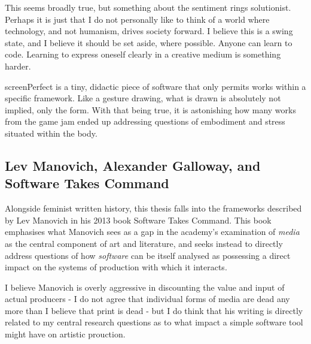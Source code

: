 This seems broadly true, but something about the sentiment rings solutionist. Perhaps it is just that I do not personally like to think of a world where technology, and not humanism, drives society forward. I believe this is a swing state, and I believe it should be set aside, where possible. Anyone can learn to code. Learning to express oneself clearly in a creative medium is something harder.

screenPerfect is a tiny, didactic piece of software that only permits works within a specific framework. Like a gesture drawing, what is drawn is absolutely not implied, only the form. With that being true, it is astonishing how many works from the game jam ended up addressing questions of embodiment and stress situated within the body.

\subsection{Lev Manovich, Alexander Galloway, and Software Takes Command}
Alongside feminist written history, this thesis falls into the frameworks described by Lev Manovich in his 2013 book Software Takes Command. This book emphasises what Manovich sees as a gap in the academy's examination of \textit{media} as the central component of art and literature, and seeks instead to directly address questions of how \textit{software} can be itself analysed as possessing a direct impact on the systems of production with which it interacts.

I believe Manovich is overly aggressive in discounting the value and input of actual producers - I do not agree that individual forms of media are dead any more than I believe that print is dead - but I do think that his writing is directly related to my central research questions as to what impact a simple software tool might have on artistic prouction.
